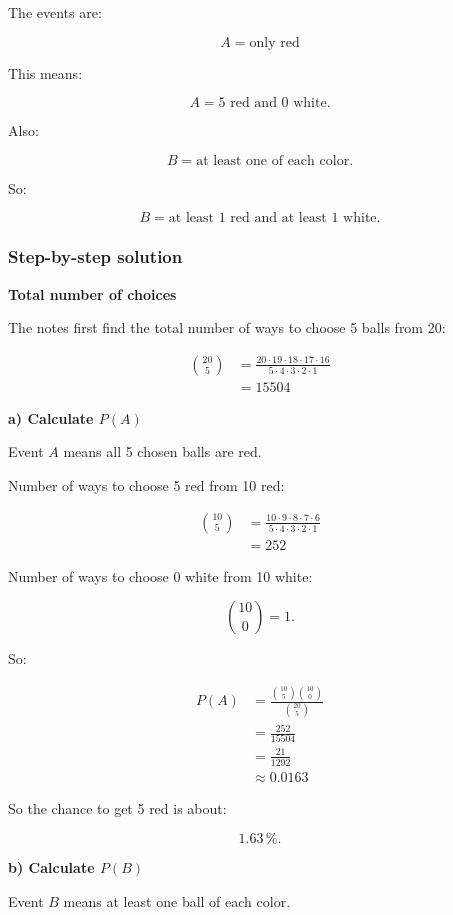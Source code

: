 \documentclass[10pt]{article}
\begin{document}
The events are:

\[
A=\text{only red}
\]

This means:

\[
A=\text{5 red and 0 white}.
\]

Also:

\[
B=\text{at least one of each color}.
\]

So:

\[
B=\text{at least 1 red and at least 1 white}.
\]

\subsubsection*{Step-by-step solution}

\textbf{Total number of choices}

The notes first find the total number of ways to choose 5 balls
from 20:

\begin{align*}
\binom{20}{5}
&=
\frac{20\cdot 19\cdot 18\cdot 17\cdot 16}
{5\cdot 4\cdot 3\cdot 2\cdot 1} \\[2mm]
&=15504
\end{align*}

\textbf{a) Calculate $P(A)$}

Event $A$ means all 5 chosen balls are red.

Number of ways to choose 5 red from 10 red:

\begin{align*}
\binom{10}{5}
&=
\frac{10\cdot 9\cdot 8\cdot 7\cdot 6}
{5\cdot 4\cdot 3\cdot 2\cdot 1} \\[2mm]
&=252
\end{align*}

Number of ways to choose 0 white from 10 white:

\[
\binom{10}{0}=1.
\]

So:

\begin{align*}
P(A)
&=
\frac{
\binom{10}{5}\binom{10}{0}
}
{\binom{20}{5}} \\[2mm]
&=
\frac{252}{15504} \\[2mm]
&=
\frac{21}{1292} \\[2mm]
&\approx 0.0163
\end{align*}

So the chance to get 5 red is about:

\[
1.63\,\%.
\]

\textbf{b) Calculate $P(B)$}

Event $B$ means at least one ball of each color.
\end{document}

